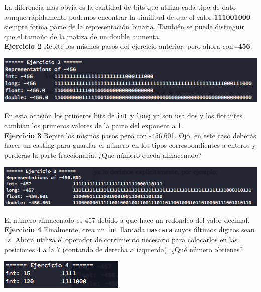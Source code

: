 \documentclass[11pt,letterpaper]{article}
\begin{document}
    La diferencia más obvia es la cantidad de bits que utiliza cada tipo de dato aunque
    rápidamente podemos encontrar la similitud de que el valor \textbf{111001000} siempre
    forma parte de la representación binaria. También se puede distinguir que el tamaño
    de la matiza de un double aumenta.\\

\textbf{Ejercicio 2} Repite los mismos pasos del ejercicio anterior, pero ahora con \textbf{-456}.

    \begin{center}
        \includegraphics[scale=.7]{assets/img/e-2.png}
    \end{center}

    En esta ocasión los primeros bits de \texttt{int} y \texttt{long} ya son usa dos y
    los flotantes cambian los primeros valores de la parte del exponent a 1.\\

\textbf{Ejercicio 3} Repite los mismos pasos pero con -456.601. Ojo, en este caso deberás
hacer un casting para guardar el número en los tipos correspondientes a enteros y perderás
la parte fraccionaria. ¿Qué número queda almacenado?

    \begin{center}
        \includegraphics[scale=.7]{assets/img/e-3.png}
    \end{center}

    El número almacenado es 457 debido a que hace un redondeo del valor decimal.\\

\textbf{Ejercicio 4} Finalmente, crea un \texttt{int} llamada \texttt{mascara} cuyos
últimos dígitos sean $1s$. Ahora utiliza el operador de corrimiento necesario para
colocarlos en las posiciones 4 a la 7 (contando de derecha a izquierda). ¿Qué número
obtienes?

    \begin{center}
        \includegraphics[scale=.7]{assets/img/e-4.png}
    \end{center}
\end{document}
